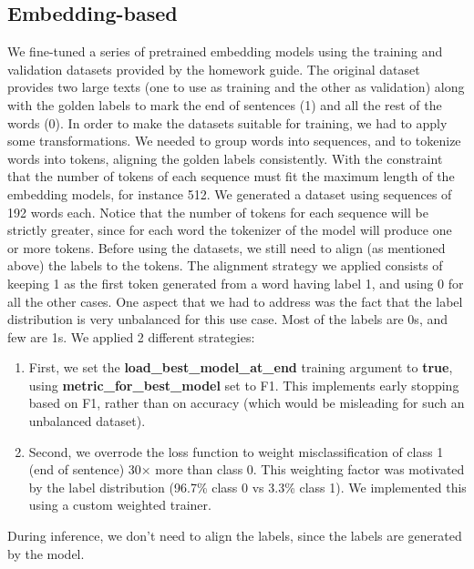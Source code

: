 \documentclass[11pt]{article}
\begin{document}
\subsection{Embedding-based}
We fine-tuned a series of pretrained embedding models using the training and validation datasets provided by the homework guide. \newline The original dataset provides two large texts (one to use as training and the other as validation) along with the golden labels to mark the end of sentences (1) and all the rest of the words (0). \newline In order to make the datasets suitable for training, we had to apply some transformations. \newline We needed to group words into sequences, and to tokenize words into tokens, aligning the golden labels consistently. \newline With the constraint that the number of tokens of each sequence must fit the maximum length of the embedding models, for instance 512. \newline We generated a dataset using sequences of 192 words each. Notice that the number of tokens for each sequence will be strictly greater, since for each word the tokenizer of the model will produce one or more tokens. \newline Before using the datasets, we still need to align (as mentioned above) the labels to the tokens. \newline The alignment strategy we applied consists of keeping 1 as the first token generated from a word having label 1, and using 0 for all the other cases. \newline One aspect that we had to address was the fact that the label distribution is very unbalanced for this use case. Most of the labels are 0s, and few are 1s. We applied 2 different strategies:
\begin{enumerate}
    \item First, we set the \textbf{load\_best\_model\_at\_end} training argument to \textbf{true}, using \textbf{metric\_for\_best\_model} set to F1. This implements early stopping based on F1, rather than on accuracy (which would be misleading for such an unbalanced dataset).
    \item Second, we overrode the loss function to weight misclassification of class 1 (end of sentence) 30× more than class 0. This weighting factor was motivated by the label distribution (96.7\% class 0 vs 3.3\% class 1). We implemented this using a custom weighted trainer. 
\end{enumerate}
During inference, we don't need to align the labels, since the labels are generated by the model.
\end{document}
